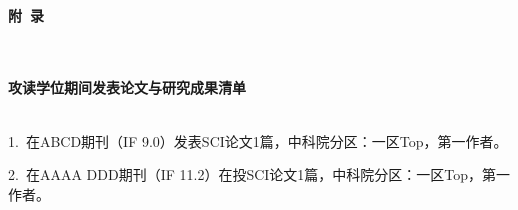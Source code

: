 \documentclass[a4paper, zihao=-4, twoside, fontset=fandol]{ctexart}
\begin{document}
{
    \newpage
    
    
}


{
    \newpage

    {
        \centering
        \heiti
        \textbf{\\ 附\ 录 \\\mbox{}\\ }
        \par %
    }
}


{
\newpage

    {
        \centering
        \heiti
        \textbf{\\ 攻读学位期间发表论文与研究成果清单 \\\mbox{}\\ }
        \par %
    }

    { 
        \raggedright
        1.~在ABCD期刊（IF 9.0）发表SCI论文1篇，中科院分区：一区Top，第一作者。
        
        2.~在AAAA DDD期刊（IF 11.2）在投SCI论文1篇，中科院分区：一区Top，第一作者。
        \par %
    }

}
\end{document}
